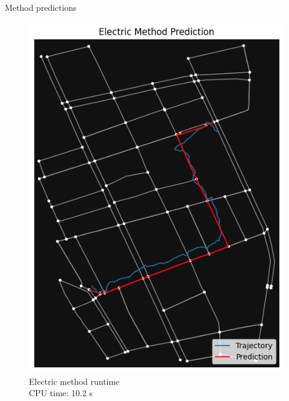 \documentclass[aspectratio=169, bigfiles, professionalfonts, hyperref={colorlinks=true, allcolors=., urlcolor=blue}]{beamer}
\begin{document}
\begin{frame}{Method predictions}
\begin{figure}[ht]
\begin{minipage}{0.24\linewidth}
\includegraphics[width=\textwidth]{Jupyter Notebook LaTeX/electricsendai.png}
\\\scriptsize{Electric method runtime\\
CPU time: 10.2 s}
\end{minipage}
\begin{minipage}{0.24\linewidth}
\centering

\end{minipage}
\end{figure}
\end{frame}
\end{document}
